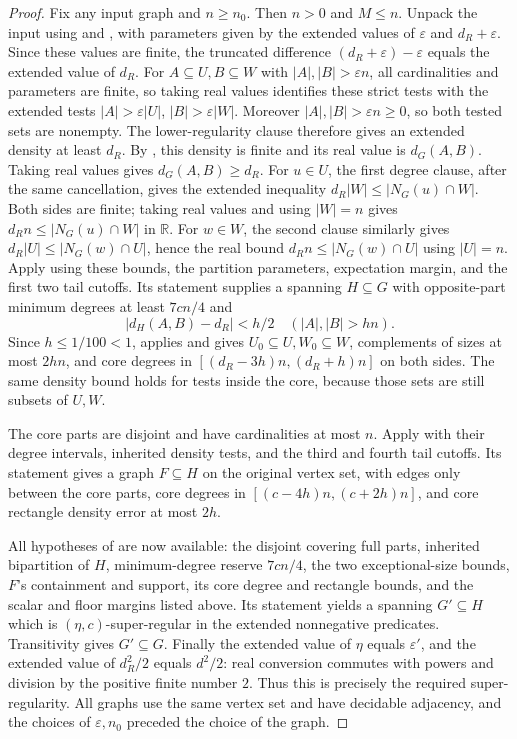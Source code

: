 \begin{proof}
Fix any input graph and $n\geq n_0$. Then $n>0$ and $M\leq n$.
Unpack the input using  and
, with parameters given by the extended
values of $\varepsilon$ and $d_R+\varepsilon$. Since these values
are finite, the truncated difference
$(d_R+\varepsilon)-\varepsilon$ equals the extended value of $d_R$.
For $A\subseteq U,B\subseteq W$ with
$|A|,|B|>\varepsilon n$, all cardinalities and parameters are finite,
so taking real values identifies these strict tests with the
extended tests $|A|>\varepsilon|U|$, $|B|>\varepsilon|W|$.
Moreover $|A|,|B|>\varepsilon n\geq0$, so both tested sets are
nonempty. The lower-regularity clause therefore gives an extended
density at least $d_R$. By , this density
is finite and its real value is $d_G(A,B)$. Taking real values
gives $d_G(A,B)\geq d_R$.
For $u\in U$, the first degree clause, after the same cancellation,
gives the extended inequality
$d_R|W|\leq|N_G(u)\cap W|$. Both sides are finite; taking real
values and using $|W|=n$ gives $d_Rn\leq|N_G(u)\cap W|$ in
$\mathbb R$. For $w\in W$, the second clause similarly gives
$d_R|U|\leq|N_G(w)\cap U|$, hence the real bound
$d_Rn\leq|N_G(w)\cap U|$ using $|U|=n$.
Apply  using these
bounds, the partition parameters, expectation margin, and the
first two tail cutoffs. Its statement supplies a spanning
$H\subseteq G$ with opposite-part minimum degrees at least
$7cn/4$ and
\[
|d_H(A,B)-d_R|<h/2\quad(|A|,|B|>hn).
\]
Since $h\leq1/100<1$,  applies
and gives $U_0\subseteq U,W_0\subseteq W$, complements of sizes
at most $2hn$, and core degrees in
$[(d_R-3h)n,(d_R+h)n]$ on both sides. The same density bound
holds for tests inside the core, because those sets are still
subsets of $U,W$.

The core parts are disjoint and have cardinalities at most $n$.
Apply  with their degree
intervals, inherited density tests, and the third and fourth
tail cutoffs. Its statement gives a graph $F\subseteq H$ on
the original vertex set, with edges only between the core
parts, core degrees in $[(c-4h)n,(c+2h)n]$, and core rectangle
density error at most $2h$.

All hypotheses of 
are now available: the disjoint covering full parts, inherited
bipartition of $H$, minimum-degree reserve $7cn/4$, the two
exceptional-size bounds, $F$'s containment and support, its
core degree and rectangle bounds, and the scalar and floor
margins listed above. Its statement yields a spanning
$G'\subseteq H$ which is $(\eta,c)$-super-regular in the
extended nonnegative predicates. Transitivity gives
$G'\subseteq G$. Finally the extended value of $\eta$ equals
$\varepsilon'$, and the extended value of $d_R^2/2$ equals
$d^2/2$: real conversion commutes with powers and division
by the positive finite number $2$. Thus this is precisely the
required super-regularity. All graphs use the same vertex
set and have decidable adjacency, and the choices of
$\varepsilon,n_0$ preceded the choice of the graph.
\end{proof}

